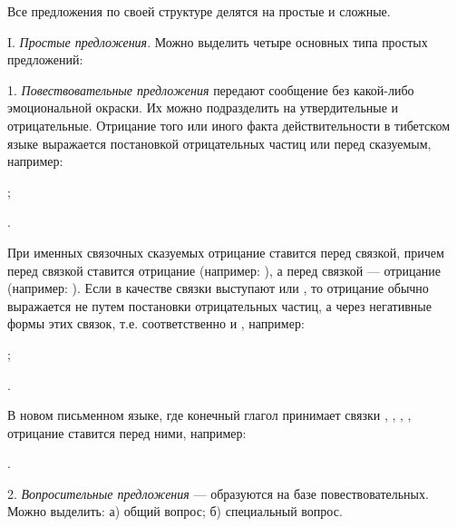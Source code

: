 Все предложения по своей структуре делятся на простые и сложные.

I. \emph{Простые предложения}. Можно выделить четыре основных типа простых предложений:

1. \emph{Повествовательные предложения} передают сообщение без какой-либо эмоциональной окраски. Их можно подразделить на утвердительные и отрицательные. Отрицание того или иного факта действительности в тибетском языке выражается постановкой отрицательных частиц  или  перед сказуемым, например:
\begin{prfsample}
	\item {};
	\item {}.
\end{prfsample}
При именных связочных сказуемых отрицание ставится перед связкой, причем перед связкой
 ставится отрицание  (например: ),
а перед связкой	 --- отрицание  (например:
). Если в качестве связки выступают  или , то отрицание обычно выражается не путем постановки отрицательных частиц, а через негативные формы этих связок, т.е. соответственно  и ,
например:
\begin{prfsample}
	\item {};
	\item {}.
\end{prfsample}

В новом письменном языке, где конечный глагол принимает связки
, , , ,
отрицание ставится перед ними, например:
\begin{prfsample}
	\item {}.
\end{prfsample}

2. \emph{Вопросительные предложения} --- образуются на базе повествовательных. Можно выделить: а) общий вопрос; б) специальный вопрос.

